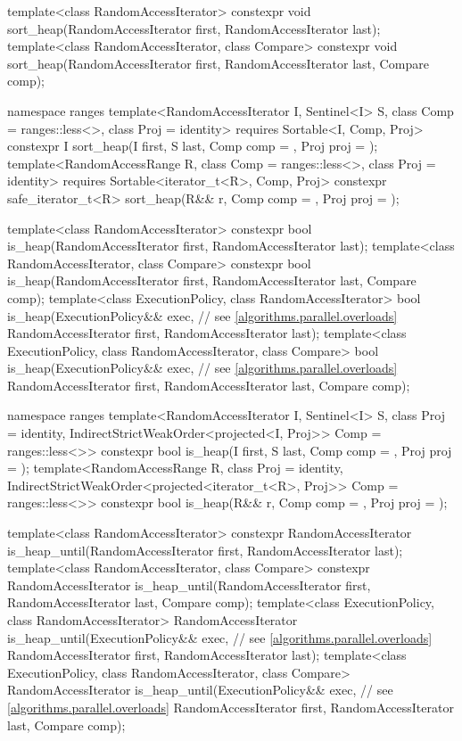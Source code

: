 \begin{codeblock}
{  template<class RandomAccessIterator>
    constexpr void sort_heap(RandomAccessIterator first, RandomAccessIterator last);
  template<class RandomAccessIterator, class Compare>
    constexpr void sort_heap(RandomAccessIterator first, RandomAccessIterator last,
                             Compare comp);

  namespace ranges {
    template<RandomAccessIterator I, Sentinel<I> S, class Comp = ranges::less<>,
             class Proj = identity>
      requires Sortable<I, Comp, Proj>
      constexpr I
        sort_heap(I first, S last, Comp comp = {}, Proj proj = {});
    template<RandomAccessRange R, class Comp = ranges::less<>, class Proj = identity>
      requires Sortable<iterator_t<R>, Comp, Proj>
      constexpr safe_iterator_t<R>
        sort_heap(R&& r, Comp comp = {}, Proj proj = {});
  }

  template<class RandomAccessIterator>
    constexpr bool is_heap(RandomAccessIterator first, RandomAccessIterator last);
  template<class RandomAccessIterator, class Compare>
    constexpr bool is_heap(RandomAccessIterator first, RandomAccessIterator last,
                           Compare comp);
  template<class ExecutionPolicy, class RandomAccessIterator>
    bool is_heap(ExecutionPolicy&& exec, // see \ref{algorithms.parallel.overloads}
                 RandomAccessIterator first, RandomAccessIterator last);
  template<class ExecutionPolicy, class RandomAccessIterator, class Compare>
    bool is_heap(ExecutionPolicy&& exec, // see \ref{algorithms.parallel.overloads}
                 RandomAccessIterator first, RandomAccessIterator last,
                 Compare comp);

  namespace ranges {
    template<RandomAccessIterator I, Sentinel<I> S, class Proj = identity,
             IndirectStrictWeakOrder<projected<I, Proj>> Comp = ranges::less<>>
      constexpr bool is_heap(I first, S last, Comp comp = {}, Proj proj = {});
    template<RandomAccessRange R, class Proj = identity,
             IndirectStrictWeakOrder<projected<iterator_t<R>, Proj>> Comp = ranges::less<>>
      constexpr bool is_heap(R&& r, Comp comp = {}, Proj proj = {});
  }

  template<class RandomAccessIterator>
    constexpr RandomAccessIterator
      is_heap_until(RandomAccessIterator first, RandomAccessIterator last);
  template<class RandomAccessIterator, class Compare>
    constexpr RandomAccessIterator
      is_heap_until(RandomAccessIterator first, RandomAccessIterator last,
                    Compare comp);
  template<class ExecutionPolicy, class RandomAccessIterator>
    RandomAccessIterator
      is_heap_until(ExecutionPolicy&& exec, // see \ref{algorithms.parallel.overloads}
                    RandomAccessIterator first, RandomAccessIterator last);
  template<class ExecutionPolicy, class RandomAccessIterator, class Compare>
    RandomAccessIterator
      is_heap_until(ExecutionPolicy&& exec, // see \ref{algorithms.parallel.overloads}
                    RandomAccessIterator first, RandomAccessIterator last,
                    Compare comp);

}
\end{codeblock}
